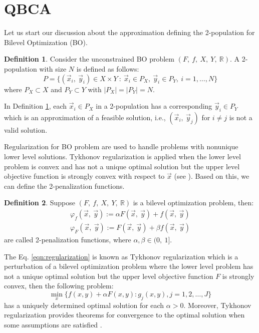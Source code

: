 \documentclass[conference]{IEEEtran}
\theoremstyle{definition}
\newtheorem{definition}{Definition}[section]
\begin{document}
\section{QBCA} %
\label{sec:qca}

Let us start our discussion about the approximation defining the
2-population for Bilevel Optimization (BO).

\begin{definition}
	\label{def:pop2}
    Consider the unconstrained BO problem $(F, \ f, \ X, \ Y, \ \mathbb{R} )$. A
    2-population with size $N$ is defined as follows:
    $$
        P = \{  (\vec{x}_i, \ \vec{y}_i) \in X \times Y \ : \
                \vec{x}_i \in P_X, \ \vec{y}_i \in P_Y, \ i=1,\ldots,N
            \}
    $$
    where $P_X \subset X$ and $P_Y \subset Y$ with $|P_X| = |P_Y| = N$.
\end{definition}
% 
In Definition \ref{def:pop2}, each $\vec{x}_i \in P_X$ in a 2-population has a
corresponding $\vec{y}_i \in P_Y$ which is an approximation of a feasible solution,
i.e., $(\vec{x}_i, \ \vec{y}_j)$ for $i \neq j$ is  not a valid solution.
% 

Regularization for BO problem are used to handle problems with nonunique lower
level solutions.  Tykhonov regularization is applied when the lower level problem
is convex and has not a unique optimal solution but the upper level objective function
is strongly convex with respect to $\vec{x}$ (see \cite{dempe2002foundations}).
Based on this, we can define the 2-penalization functions.

\begin{definition}
    Suppose $(F, \ f, \ X, \ Y, \ \mathbb{R} )$ is a bilevel optimization problem,
    then:
    \begin{align}
        \label{eqn:regularization}
        \varphi_f (\vec{x},\ \vec{y}) := \alpha F(\vec{x},\ \vec{y}) +  f(\vec{x},\ \vec{y}) \\
        \label{eqn:regularization2}
        \varphi_F (\vec{x},\ \vec{y}) := F(\vec{x},\ \vec{y}) +  \beta f(\vec{x},\ \vec{y})
    \end{align}
    are called 2-penalization functions, where $\alpha, \beta \in (0,\ 1]$.
\end{definition}
% 
The Eq. \ref{eqn:regularization} is known as Tykhonov regularization which is a
perturbation of a bilevel optimization problem where the lower level problem has
not a unique optimal solution but the upper level objective function $F$ is 
strongly convex, then the following problem:
\begin{equation}
	\min_x \{ f(x,y) + \alpha F(x, y) : g_j(x, y), j=1,2,\ldots, J\} 
	\label{eqn:relaxed}
\end{equation}
% 
has a uniquely determined optimal solution for each $\alpha > 0$. 
Moreover, Tykhonov regularization provides theorems for convergence to the optimal
solution when some assumptions are satisfied \cite{dempe2002foundations}. 
\\
\end{document}
